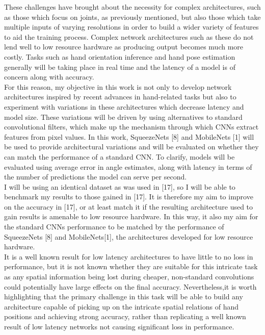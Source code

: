 \documentclass{article}
\begin{document}
These challenges have brought about the necessity for complex architectures, such as those which focus on joints, as previously mentioned, but also those which take multiple inputs of varying resolutions in order to build a wider variety of features to aid the training process. Complex network architectures such as these do not lend well to low resource hardware as producing output becomes much more costly. Tasks such as hand orientation inference and hand pose estimation generally will be taking place in real time and the latency of a model is of concern along with accuracy. \\

For this reason, my objective in this work is not only to develop network architectures inspired by recent advances in hand-related tasks but also to experiment with variations in these architectures which decrease latency and model size. These variations will be driven by using alternatives to standard convolutional filters, which make up the mechanism through which CNNs extract features from pixel values. In this work, SqueezeNets [8] and MobileNets [1] will be used to provide architectural variations and will be evaluated on whether they can match the performance of a standard CNN. To clarify, models will be evaluated using average error in angle estimates, along with latency in terms of the number of predictions the model can serve per second.\\

I will be using an identical dataset as was used in [17], so I will be able to benchmark my results to those gained in [17]. It is therefore my aim to improve on the accuracy in [17], or at least match it if the resulting architecture used to gain results is amenable to low resource hardware. In this way, it also my aim for the standard CNNs performance to be matched by the performance of SqueezeNets [8] and MobileNets[1], the architectures developed for low resource hardware. \\

It is a well known result for low latency architectures to have little to no loss in performance, but it is not known whether they are suitable for this intricate task as any spatial information being lost during cheaper, non-standard convolutions could potentially have large effects on the final accuracy. Nevertheless,it is worth highlighting that the primary challenge in this task will be able to build any architecture capable of picking up on the intricate spatial relations of hand positions and achieving strong accuracy, rather than replicating a well known result of low latency networks not causing significant loss in performance. \\
\end{document}
